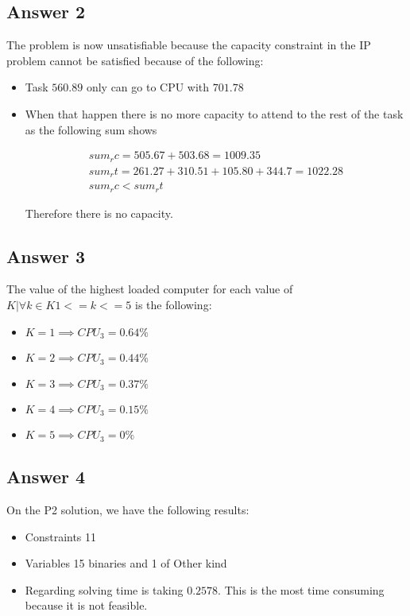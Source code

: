 \documentclass[12pt, a4paper]{article}
\begin{document}
\subsection{Answer 2}
The problem is now unsatisfiable because the capacity constraint in the IP
problem cannot be satisfied because of the following:

\begin{itemize}
\item Task $560.89$ only can go to CPU with $701.78$
  \item When that happen there is no more capacity to attend to the rest of the
    task as the following sum shows

    \begin{subequations}
      \begin{align}
        sum_rc = 505.67 + 503.68 = 1009.35 \\
        sum_rt = 261.27 + 310.51 + 105.80 + 344.7 = 1022.28 \\
        sum_rc < sum_rt 
      \end{align}
    \end{subequations}

    Therefore there is no capacity.
\end{itemize}

\subsection{Answer 3}
The value of the highest loaded computer for each value of $K | \forall k \in K
1 <= k <= 5$ is the following:

\begin{itemize}
\item $K = 1 \implies CPU_3 = 0.64\%$
\item $K = 2 \implies CPU_3 = 0.44\%$
\item $K = 3 \implies CPU_3 = 0.37\%$
\item $K = 4 \implies CPU_3 = 0.15\%$
\item $K = 5 \implies CPU_3 = 0\%$
\end{itemize}

\subsection{Answer 4}

On the P2 solution, we have the following results:

\begin{itemize}
  \item Constraints 11
  \item Variables 15 binaries and 1 of Other kind
  \item Regarding solving time is taking $0.2578$. This is the most time
    consuming because it is not feasible.
\end{itemize}
\end{document}
